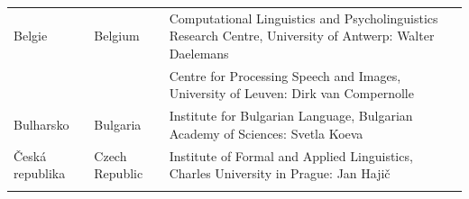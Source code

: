 \small
\begin{longtable}{@{}llp{113mm}@{}}
  Belgie & \textcolor{grey1}{Belgium} & Computational Linguistics and Psycholinguistics Research Centre, University of Antwerp: Walter Daelemans\\ \addlinespace
  & & Centre for Processing Speech and Images, University of Leuven: Dirk van Compernolle \\ \addlinespace
  Bulharsko & \textcolor{grey1}{Bulgaria} & Institute for Bulgarian Language, Bulgarian Academy of Sciences: Svetla Koeva \\ \addlinespace
  
  Česká republika & \textcolor{grey1}{Czech Republic} & Institute of Formal and Applied Linguistics, Charles University in Prague: Jan Hajič \\ \addlinespace 
 

\end{longtable}
